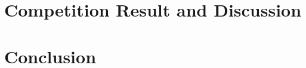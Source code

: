 \documentclass{article}
\begin{document}
\section{Competition Result and Discussion}

\section{Conclusion}





\appendix
\newcommand{\appsection}[1]{\let\oldthesection\thesection
  \renewcommand{\thesection}{Appendix \oldthesection:}
  \section{#1}\let\thesection\oldthesection}

\end{document}
